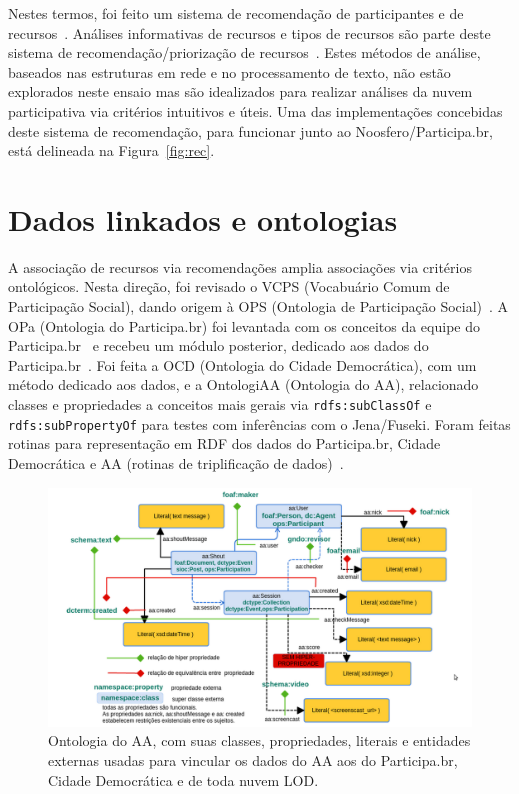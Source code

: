 \documentclass[a4paper, 11pt]{article} %
\begin{document}
Nestes termos, foi feito um sistema de recomendação de participantes e de recursos~\cite{pnud4}. Análises informativas de recursos e tipos de recursos são parte deste sistema de recomendação/priorização de recursos~\cite{pnud3}. Estes métodos de análise, baseados nas estruturas em rede e no processamento de texto, não estão explorados neste ensaio mas são idealizados para realizar análises da nuvem participativa via critérios intuitivos e úteis.
 Uma das implementações concebidas deste sistema de recomendação, para funcionar junto ao Noosfero/Participa.br, está delineada na Figura~\ref{fig:rec}.



\section*{Dados linkados e ontologias}
A associação de recursos via recomendações amplia associações via critérios ontológicos. Nesta direção, foi revisado o VCPS (Vocabuário Comum de Participação Social), dando origem à OPS (Ontologia de Participação Social)~\cite{OPS}. A OPa (Ontologia do Participa.br) foi levantada com os conceitos da equipe do Participa.br~\cite{OPA} e recebeu um módulo posterior, dedicado aos dados do Participa.br~\cite{pnud5}. Foi feita a OCD (Ontologia do Cidade Democrática), com um método dedicado aos dados, e a OntologiAA (Ontologia do AA), relacionado classes e propriedades a conceitos mais gerais via \texttt{rdfs:subClassOf} e \texttt{rdfs:subPropertyOf} para testes com inferências com o Jena/Fuseki. Foram feitas rotinas para representação em RDF dos dados do Participa.br, Cidade Democrática e AA (rotinas de triplificação de dados)~\cite{pnud5}.
\begin{figure}[H]
  \centering
    \includegraphics[width=1.\textwidth]{ontologiaa.png}
  \caption{\small Ontologia do AA, com suas classes, propriedades, literais e entidades externas usadas para vincular os dados do AA aos do Participa.br, Cidade Democrática e de toda nuvem LOD.}\label{fig:ontologiaa}
\end{figure}
\end{document}
